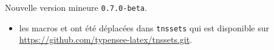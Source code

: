 Nouvelle version mineure \verb+0.7.0-beta+.

\begin{itemize}[itemsep=.5em]
    \item {}
          les macros  et  ont été déplacées dans \verb#tnssets# qui est disponible sur \url{https://github.com/typensee-latex/tnssets.git}.
    
\end{itemize}

\separation